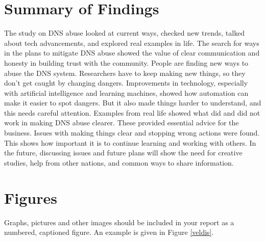 \section{Summary of Findings}

The study on DNS abuse looked at current ways, checked new trends, talked about tech advancements, and explored real examples in life. The search for ways in the plans to mitigate DNS abuse showed the value of clear communication and honesty in building trust with the community. People are finding new ways to abuse the DNS system. Researchers have to keep making new things, so they don't get caught by changing dangers. Improvements in technology, especially with artificial intelligence and learning machines, showed how automation can make it easier to spot dangers. But it also made things harder to understand, and this needs careful attention. Examples from real life showed what did and did not work in making DNS abuse clearer. These provided essential advice for the business. Issues with making things clear and stopping wrong actions were found. This shows how important it is to continue learning and working with others. In the future, discussing issues and future plans will show the need for creative studies, help from other nations, and common ways to share information. 



\section{Figures}
Graphs, pictures and other images should be included in your report as a numbered, captioned figure. An example is given in Figure \ref{veldis}.

